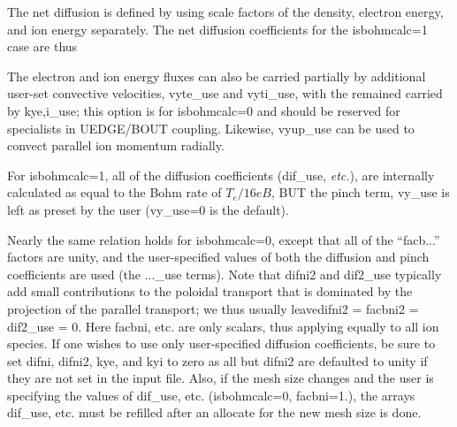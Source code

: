 \documentclass [12pt]{article}
\def\hsa{\hskip.4truein}
\begin{document}
The net diffusion is defined by using scale factors of the density, electron
energy, and ion energy separately.  The net diffusion coefficients for the
{\sf isbohmcalc=1} case are thus
{\sf
{} }
The electron and ion energy fluxes can also be carried partially by additional
user-set convective velocities, {\sf vyte\_use} and {\sf vyti\_use}, with the
remained carried by {\sf kye,i\_use}; this option is for {\sf isbohmcalc=0} and
should be reserved for specialists in {\sf UEDGE/BOUT} coupling.  Likewise,
{\sf vyup\_use} can be used to convect parallel ion momentum radially.

For {\sf isbohmcalc=1}, all of the diffusion coefficients (dif\_use, {\it
  etc.}), are internally calculated as equal to the Bohm rate of $T_e/16eB$,
BUT the pinch term, vy\_use is left as preset by the user (vy\_use=0 is the
default). 

Nearly the same relation holds for {\sf isbohmcalc=0}, except that all of the
``facb...''  factors are unity, and the user-specified values of both the
diffusion and pinch coefficients are used (the ...\_use terms).  Note that {\sf
  difni2} and {\sf dif2\_use} typically add small contributions to the
poloidal transport that is dominated by the projection of the parallel
transport; we thus usually leave{\sf difni2 = facbni2 = dif2\_use = 0}.  Here
{\sf facbni}, etc. are only scalars, thus applying equally to all ion species.
If one wishes to use only user-specified diffusion coefficients, be sure to
set {\sf difni, difni2, kye,} and {\sf kyi} to zero as all but {\sf difni2}
are defaulted to unity if they are not set in the input file.  Also, if the
mesh size changes and the user is specifying the values of {\sf dif\_use},
etc. ({\sf isbohmcalc=0, facbni=1.}), the arrays {\sf dif\_use}, etc.  must be
refilled after an allocate for the new mesh size is done.
\end{document}
